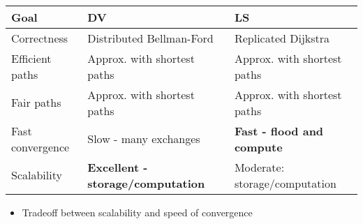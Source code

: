\begin{itemize}
    \\
\begin{tabular}{| l | l | l |}
    Goal & DV & LS\\\hline
    Correctness & Distributed Bellman-Ford & Replicated Dijkstra\\
    Efficient paths & Approx. with shortest paths & Approx. with shortest paths\\
    Fair paths & Approx. with shortest paths & Approx. with shortest paths\\
    Fast convergence & Slow - many exchanges & \textbf{Fast - flood and compute}\\
    Scalability & \textbf{Excellent - storage/computation} & Moderate: storage/computation
\end{tabular}
        \begin{itemize}
            \item Tradeoff between scalability and speed of convergence\\
        \end{itemize}
\end{itemize}

